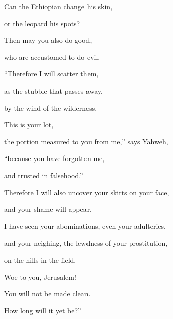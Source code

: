{\par }{\Q {}Can the Ethiopian change his skin,
\par }{\QB or the leopard his spots?
\par }{\Q Then may you also do good,
\par }{\QB who are accustomed to do evil.
\par }{\BB \par }{\Q {}“Therefore I will scatter them,
\par }{\QB as the stubble that passes away,
\par }{\QB by the wind of the wilderness.
\par }{\Q {}This is your lot,
\par }{\QB the portion measured to you from me,” says Yahweh,
\par }{\Q “because you have forgotten me,
\par }{\QB and trusted in falsehood.”
\par }{\Q {}Therefore I will also uncover your skirts on your face,
\par }{\QB and your shame will appear.
\par }{\Q {}I have seen your abominations, even your adulteries,
\par }{\QB and your neighing, the lewdness of your prostitution,
\par }{\QB on the hills in the field.
\par }{\Q Woe to you, Jerusalem!
\par }{\QB You will not be made clean.
\par }{\QB How long will it yet be?”

}
